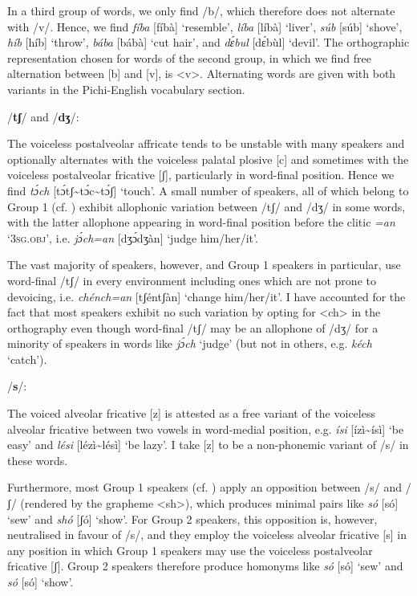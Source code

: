 In a third group of words, we only find /b/, which therefore does not alternate with /v/. Hence, we find \textit{fíba} [fíbà] ‘resemble’, \textit{líba} [líbà] ‘liver’, \textit{súb} [súb] ‘shove’, \textit{híb} [híb] ‘throw’, \textit{bába} [bábà] ‘cut hair’, and \textit{dɛ́bul} [dɛ́bùl] ‘devil’. The orthographic representation chosen for words of the second group, in which we find free alternation between [b] and [v], is <v>. Alternating words are given with both variants in the Pichi-English vocabulary section.


/\textbf{tʃ}/ and /\textbf{dʒ}/:

The voiceless postalveolar affricate tends to be unstable with many speakers and optionally alternates with the voiceless palatal plosive [c] and sometimes with the voiceless postalveolar fricative [ʃ], particularly in word-final position. Hence we find \textit{tɔ́ch} [tɔ́tʃ\textasciitilde tɔ́c\textasciitilde tɔ́ʃ] ‘touch’. A small number of speakers, all of which belong to Group 1 (cf. ) exhibit allophonic variation between /tʃ/ and /dʒ/ in some words, with the latter allophone appearing in word-final position before the clitic \textit{=an} ‘\textsc{3sg.obj}’, i.e. \textit{jɔ́ch=an} [dʒɔ́dʒàn] ‘judge him/her/it’. 


The vast majority of speakers, however, and Group 1 speakers in particular, use word-final /tʃ/ in every environment including ones which are not prone to devoicing, i.e. \textit{chénch=an} [tʃéntʃàn] ‘change him/her/it’. I have accounted for the fact that most speakers exhibit no such variation by opting for <ch> in the orthography even though word-final /tʃ/ may be an allophone of /dʒ/ for a minority of speakers in words like \textit{jɔ́ch} ‘judge’ (but not in others, e.g. \textit{kéch} ‘catch’).


\newpage 
/\textbf{s}/:

The voiced alveolar fricative [z] is attested as a free variant of the voiceless alveolar fricative between two vowels in word-medial position, e.g. \textit{ísi} [ízì{\textasciitilde}ísì] ‘be easy’ and \textit{lési} [lézì{\textasciitilde}lésì] ‘be lazy’. I take [z] to be a non-phonemic variant of /s/ in these words. 


Furthermore, most Group 1 speakers (cf. ) apply an opposition between /s/ and /ʃ/ (rendered by the grapheme <sh>), which produces minimal pairs like \textit{só} [só] ‘sew’ and \textit{shó} [ʃó] ‘show’. For Group 2 speakers, this opposition is, however, neutralised in favour of /s/, and they employ the voiceless alveolar fricative [s] in any position in which Group 1 speakers may use the voiceless postalveolar fricative [ʃ]. Group 2 speakers therefore produce homonyms like \textit{só} [só] ‘sew’ and \textit{só} [só] ‘show’.



